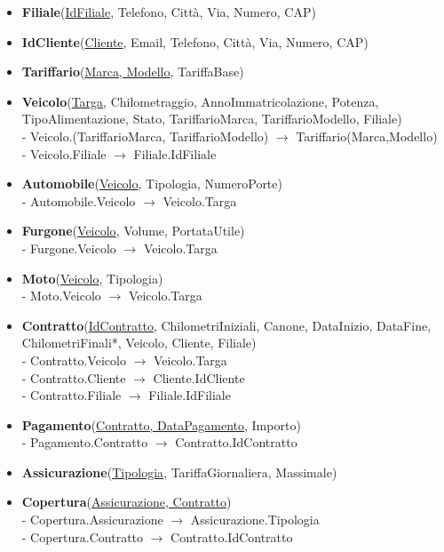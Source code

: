 \documentclass[10pt,a4paper]{article}
\begin{document}
\begin{itemize}
    \item \textbf{Filiale}(\underline{IdFiliale}, Telefono, Città, Via, Numero, CAP)
    \item \textbf{IdCliente}(\underline{Cliente}, Email, Telefono, Città, Via, Numero, CAP)
    \item \textbf{Tariffario}(\underline{Marca, Modello}, TariffaBase)
    \item \textbf{Veicolo}(\underline{Targa}, Chilometraggio, AnnoImmatricolazione, Potenza, TipoAlimentazione, Stato, TariffarioMarca, TariffarioModello, Filiale)
    \\
    - Veicolo.(TariffarioMarca, TariffarioModello) $\rightarrow$ Tariffario(Marca,Modello)
    \\
    - Veicolo.Filiale $\rightarrow$ Filiale.IdFiliale
    \item \textbf{Automobile}(\underline{Veicolo}, Tipologia, NumeroPorte)
    \\
    - Automobile.Veicolo $\rightarrow$ Veicolo.Targa
    \item \textbf{Furgone}(\underline{Veicolo}, Volume, PortataUtile)
    \\
    - Furgone.Veicolo $\rightarrow$ Veicolo.Targa
    \item \textbf{Moto}(\underline{Veicolo}, Tipologia)
    \\
    - Moto.Veicolo $\rightarrow$ Veicolo.Targa
    \item \textbf{Contratto}(\underline{IdContratto}, ChilometriIniziali, Canone, DataInizio, DataFine, ChilometriFinali*, Veicolo, Cliente, Filiale)
    \\
    - Contratto.Veicolo $\rightarrow$ Veicolo.Targa
    \\
    - Contratto.Cliente $\rightarrow$ Cliente.IdCliente
    \\
    - Contratto.Filiale $\rightarrow$ Filiale.IdFiliale
    \item \textbf{Pagamento}(\underline{Contratto, DataPagamento}, Importo)
    \\
    - Pagamento.Contratto $\rightarrow$ Contratto.IdContratto
    \item \textbf{Assicurazione}(\underline{Tipologia}, TariffaGiornaliera, Massimale)
    \item \textbf{Copertura}(\underline{Assicurazione, Contratto})
    \\
    - Copertura.Assicurazione $\rightarrow$ Assicurazione.Tipologia
    \\
    - Copertura.Contratto $\rightarrow$ Contratto.IdContratto

\end{itemize}
\end{document}
